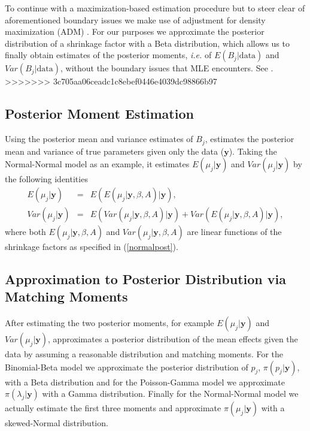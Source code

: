 \documentclass[article]{jss}
\begin{document}
To continue with a maximization-based estimation procedure but to steer clear of aforementioned boundary issues we make use of adjustment for density maximization (ADM) \citep{carl1988, 1997, 2011}. For our purposes we approximate the posterior distribution of a shrinkage factor with a Beta distribution, which allows us to finally obtain estimates of the posterior moments, \emph{i.e.}  of $E(B_{j}\vert\textrm{data})$ and $Var(B_{j}\vert\textrm{data})$, without the boundary issues that MLE encounters. See \cite{2011}.
>>>>>>> 3c705aa06ceadc1c8ebef0446e4039dc98866b97

\subsection[Posterior Moment Estimation]{Posterior Moment Estimation}

Using the posterior mean and variance estimates of $B_{j}$,  estimates the posterior mean and variance of true parameters given only the data ($\textbf{y}$). Taking the Normal-Normal model as an example, it estimates $E(\mu_{j}\vert \textbf{y})$ and $Var(\mu_{j}\vert \textbf{y})$ by the following identities
\begin{eqnarray}
E(\mu_{j}\vert \textbf{y}) & = & E(E(\mu_{j}\vert \textbf{y}, \beta, A)\vert \textbf{y}), \\
Var(\mu_{j}\vert \textbf{y}) & = & E(Var(\mu_{j}\vert \textbf{y}, \beta, A)\vert \textbf{y})+Var(E(\mu_{j}\vert \textbf{y}, \beta, A)\vert \textbf{y}),
\end{eqnarray}  
where both $E(\mu_{j}\vert \textbf{y}, \beta, A)$ and $Var(\mu_{j}\vert \textbf{y}, \beta, A)$ are linear functions of the shrinkage factors as specified in (\ref{normalpost}).

\subsection[Approximation to Posterior Distribution by Moment Matching]{Approximation to Posterior Distribution via Matching Moments}
After estimating the two posterior moments, for example $E(\mu_{j}\vert \textbf{y})$ and $Var(\mu_{j}\vert \textbf{y})$,  approximates a posterior distribution of the mean effects given the data by assuming a reasonable distribution and matching moments. For the Binomial-Beta model we approximate the posterior distribution of $p_{j}$, $\pi(p_{j}\vert \textbf{y})$, with a Beta distribution and for the Poisson-Gamma model we approximate $\pi(\lambda_{j}\vert \textbf{y})$ with a Gamma distribution. Finally for the Normal-Normal model we actually estimate the first three moments and approximate $\pi(\mu_{j}\vert \textbf{y})$ with a skewed-Normal distribution. 
\end{document}
